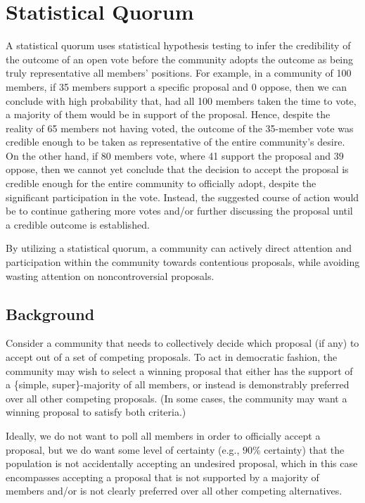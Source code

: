 \documentclass[chi_draft]{sigchi}
\begin{document}
\section{Statistical Quorum}
\label{sec:statistical-quorum}
A statistical quorum uses statistical hypothesis testing to infer the credibility of the outcome of an open vote before the community adopts the outcome as being truly representative all members' positions.
For example, in a community of 100 members, if 35 members support a specific proposal and 0 oppose, then we can conclude with high probability that, had all 100 members taken the time to vote, a majority of them would be in support of the proposal.  Hence, despite the reality of 65 members not having voted, the outcome of the 35-member vote was credible enough to be taken as representative of the entire community's desire.
On the other hand, if 80 members vote, where 41 support the proposal and 39 oppose, then we cannot yet conclude that the decision to accept the proposal is credible enough for the entire community to officially adopt, despite the significant participation in the vote.
Instead, the suggested course of action would be to continue gathering more votes and/or further discussing the proposal until a credible outcome is established.

By utilizing a statistical quorum, a community can actively direct attention and participation within the community towards contentious proposals, while avoiding wasting attention on noncontroversial proposals.

\subsection{Background}
Consider a community that needs to collectively decide which proposal (if any) to accept out of a set of competing proposals.
To act in democratic fashion, the community may wish to select a winning proposal that either has the support of a \{simple, super\}-majority of all members, or instead is demonstrably preferred over all other competing proposals.  (In some cases, the community may want a winning proposal to satisfy both criteria.)

Ideally, we do not want to poll all members in order to officially accept a proposal, but we do want some level of certainty (e.g., $90\%$ certainty) that
the population is not accidentally accepting an undesired proposal, which in this case encompasses accepting a proposal that is not supported by a majority of members and/or is not clearly preferred over all other competing alternatives.
\end{document}
